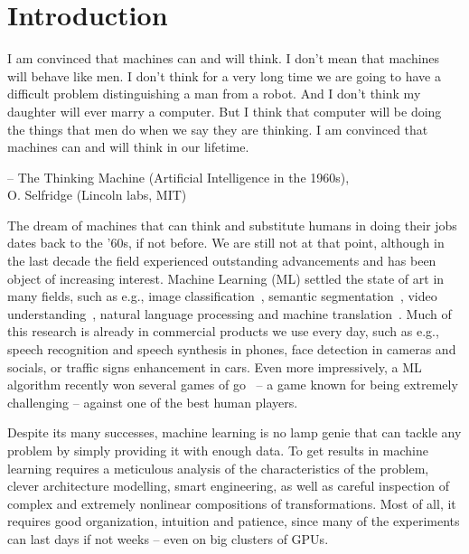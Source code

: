 \chapter{Introduction}


{
    \setlength\epigraphwidth{10cm}
    \setlength\epigraphrule{0pt}
    \renewcommand{\epigraphflush}{center}
    \epigraph{
        I am convinced that machines can and will think. I don't mean that
        machines will behave like men. I don't think for a very long time we
        are going to have a difficult problem distinguishing a man from a
        robot. And I don't think my daughter will ever marry a computer. But I
        think that computer will be doing the things that men do when we say
        they are thinking. I am convinced that machines can and will think in
        our lifetime.}{-- \textup{The Thinking Machine (Artificial Intelligence
            in the 1960s)}, \\ O. Selfridge (Lincoln labs, MIT)}
}

The dream of machines that can think and substitute humans in doing their jobs
dates back to the '60s, if not before. We are still not at that point, although
in the last decade the field experienced outstanding advancements and has been
object of increasing interest. Machine Learning (ML) settled the state of art
in many fields, such as e.g., image classification~\cite{Krizhevsky-2012,
szegedy2016inception, visin2015renet}, semantic
segmentation~\cite{chen2015semantic, visin15}, video
understanding~\citep{srivastava2015unsupervised, Xu-et-al-arxiv2015}, natural
language processing and machine translation~\citep{Bahdanau-et-al-arxiv2014}.
Much of this research is already in commercial products we use every day, such
as e.g., speech recognition and speech synthesis in phones, face detection in
cameras and socials, or traffic signs enhancement in cars. Even more
impressively, a ML algorithm recently won several games of
go~\citep{silver2016alphago} -- a game known for being extremely challenging --
against one of the best human players.

Despite its many successes, machine learning is no lamp genie that can tackle
any problem by simply providing it with enough data. To get results in
machine learning requires a meticulous analysis of the characteristics of the
problem, clever architecture modelling, smart engineering, as well as careful
inspection of complex and extremely nonlinear compositions of transformations.
Most of all, it requires good organization, intuition and patience, since many
of the experiments can last days if not weeks -- even on big clusters of GPUs.

